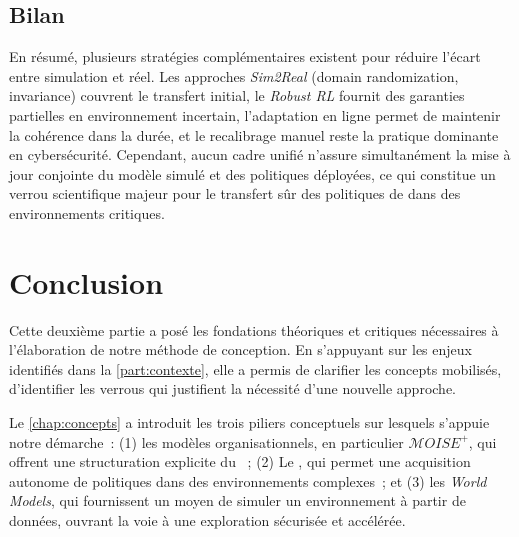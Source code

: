 \section{Bilan}
\noindent
En résumé, plusieurs stratégies complémentaires existent
pour réduire l'écart entre simulation et réel.
Les approches \textit{Sim2Real} (domain randomization, invariance)
couvrent le transfert initial,
le \textit{Robust RL} fournit des garanties partielles en environnement incertain,
l'adaptation en ligne permet de maintenir la cohérence dans la durée,
et le recalibrage manuel reste la pratique dominante en cybersécurité.
Cependant, aucun cadre unifié n'assure simultanément
la mise à jour conjointe du modèle simulé et des politiques déployées,
ce qui constitue un verrou scientifique majeur pour le transfert sûr
des politiques de  dans des environnements critiques.

\clearpage
\thispagestyle{empty}
\null
\newpage


\chapter*{Conclusion}

\noindent
Cette deuxième partie a posé les fondations théoriques et critiques nécessaires à l'élaboration de notre méthode de conception. En s'appuyant sur les enjeux identifiés dans la \autoref{part:contexte}, elle a permis de clarifier les concepts mobilisés, d'identifier les verrous qui justifient la nécessité d'une nouvelle approche.

\medskip

\noindent
Le \autoref{chap:concepts} a introduit les trois piliers conceptuels sur lesquels s'appuie notre démarche~: (1) les modèles organisationnels, en particulier \textit{$\mathcal{M}OISE^+$}, qui offrent une structuration explicite du ~; (2) Le , qui permet une acquisition autonome de politiques dans des environnements complexes~; et (3) les \textit{World Models}, qui fournissent un moyen de simuler un environnement à partir de données, ouvrant la voie à une exploration sécurisée et accélérée.

